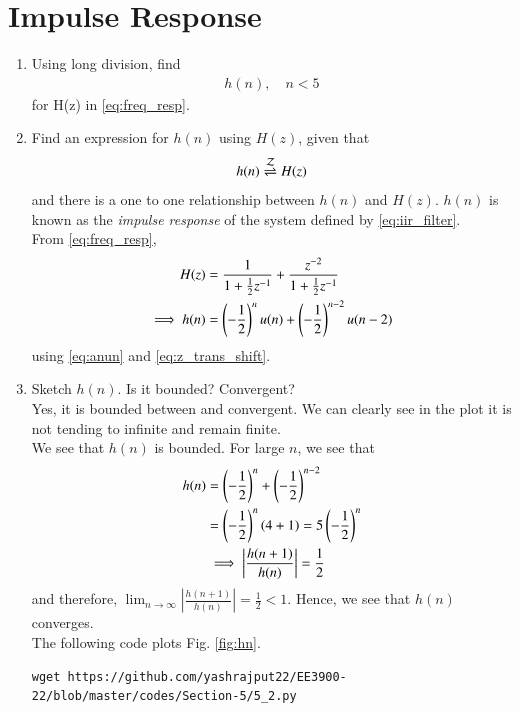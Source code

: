 \section{Impulse Response}
\begin{enumerate}[label=\thesection.\arabic*]
	\item Using long division, 
find
		\begin{align}
			h(n), \quad n < 5
		\end{align}
		for H(z) in 
		\eqref{eq:freq_resp}.
\item \label{prob:impulse_resp}
Find an expression for $h(n)$ using $H(z)$, given that 
\begin{equation}
\label{eq:impulse_resp}
h(n) \overset{\mathcal{Z}}{ \rightleftharpoons} H(z)
\end{equation}
and there is a one to one relationship between $h(n)$ and $H(z)$. $h(n)$ is known as the {\em impulse response} of the
system defined by \eqref{eq:iir_filter}.
\\
\solution From \eqref{eq:freq_resp},
\begin{align}
H(z) &= \frac{1}{1 + \frac{1}{2}z^{-1}} + \frac{ z^{-2}}{1 + \frac{1}{2}z^{-1}}
\\
\implies h(n) &= \left(-\frac{1}{2}\right)^{n}u(n) + \left(-\frac{1}{2}\right)^{n-2}u(n-2)
\end{align}
using \eqref{eq:anun} and \eqref{eq:z_trans_shift}.
\item Sketch $h(n)$. Is it bounded? Convergent? 
\\
\solution Yes, it is bounded between and convergent. We can clearly see in the plot it is not tending to infinite and remain finite.
\\
We see that $h(n)$ is bounded. For large $n$, we see that 
\begin{align}
	h(n) &= \left(-\frac{1}{2}\right)^n + \left(-\frac{1}{2}\right)^{n - 2} \\
		 &= \left(-\frac{1}{2}\right)^{n}\left(4 + 1\right) = 5\left(-\frac{1}{2}\right)^n \\
		 &\implies \left|\frac{h(n + 1)}{h(n)}\right| = \frac{1}{2}
\end{align}
and therefore, $\lim_{n \to \infty}\left|\frac{h(n + 1)}{h(n)}\right| = \frac{1}{2} < 1$. Hence, we see that $h(n)$ converges.
\\
The following code plots Fig. \ref{fig:hn}.
\begin{lstlisting}
wget https://github.com/yashrajput22/EE3900-22/blob/master/codes/Section-5/5_2.py
\end{lstlisting}

\end{enumerate}
